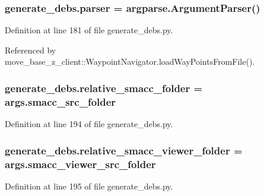 \subsubsection[{\texorpdfstring{parser}{parser}}]{\setlength{\rightskip}{0pt plus 5cm}generate\+\_\+debs.\+parser = argparse.\+Argument\+Parser()}\hypertarget{namespacegenerate__debs_a4a9ae4bb85fc62d7973ea3d09ced6c26}{}\label{namespacegenerate__debs_a4a9ae4bb85fc62d7973ea3d09ced6c26}


Definition at line 181 of file generate\+\_\+debs.\+py.



Referenced by move\+\_\+base\+\_\+z\+\_\+client\+::\+Waypoint\+Navigator.\+load\+Way\+Points\+From\+File().

\subsubsection[{\texorpdfstring{relative\+\_\+smacc\+\_\+folder}{relative_smacc_folder}}]{\setlength{\rightskip}{0pt plus 5cm}generate\+\_\+debs.\+relative\+\_\+smacc\+\_\+folder = args.\+smacc\+\_\+src\+\_\+folder}\hypertarget{namespacegenerate__debs_abf6925bd06ac1da3981fe638eefb5a61}{}\label{namespacegenerate__debs_abf6925bd06ac1da3981fe638eefb5a61}


Definition at line 194 of file generate\+\_\+debs.\+py.

\subsubsection[{\texorpdfstring{relative\+\_\+smacc\+\_\+viewer\+\_\+folder}{relative_smacc_viewer_folder}}]{\setlength{\rightskip}{0pt plus 5cm}generate\+\_\+debs.\+relative\+\_\+smacc\+\_\+viewer\+\_\+folder = args.\+smacc\+\_\+viewer\+\_\+src\+\_\+folder}\hypertarget{namespacegenerate__debs_a22d892b78adfce583710d78737eb4747}{}\label{namespacegenerate__debs_a22d892b78adfce583710d78737eb4747}


Definition at line 195 of file generate\+\_\+debs.\+py.

